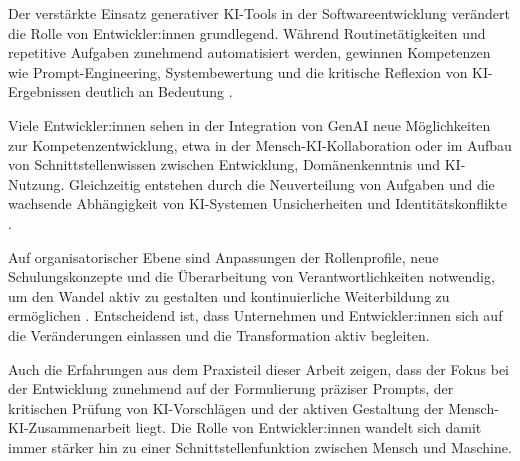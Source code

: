 
Der verstärkte Einsatz generativer KI-Tools in der Softwareentwicklung
verändert die Rolle von Entwickler:innen grundlegend. Während
Routinetätigkeiten und repetitive Aufgaben zunehmend automatisiert werden,
gewinnen Kompetenzen wie Prompt-Engineering, Systembewertung und die kritische
Reflexion von KI-Ergebnissen deutlich an Bedeutung
\cite{schmitt_generative_2024}.

Viele Entwickler:innen sehen in der Integration von GenAI neue Möglichkeiten
zur Kompetenzentwicklung, etwa in der Mensch-KI-Kollaboration oder im Aufbau
von Schnittstellenwissen zwischen Entwicklung, Domänenkenntnis und KI-Nutzung.
Gleichzeitig entstehen durch die Neuverteilung von Aufgaben und die wachsende
Abhängigkeit von KI-Systemen Unsicherheiten und Identitätskonflikte
\cite{schmitt_generative_2024}.

Auf organisatorischer Ebene sind Anpassungen der Rollenprofile, neue
Schulungskonzepte und die Überarbeitung von Verantwortlichkeiten notwendig, um
den Wandel aktiv zu gestalten und kontinuierliche Weiterbildung zu ermöglichen
\cite{nguyen-duc_generative_2023}. Entscheidend ist, dass Unternehmen und
Entwickler:innen sich auf die Veränderungen einlassen und die Transformation
aktiv begleiten.

Auch die Erfahrungen aus dem Praxisteil dieser Arbeit zeigen, dass der Fokus
bei der Entwicklung zunehmend auf der Formulierung präziser Prompts, der
kritischen Prüfung von KI-Vorschlägen und der aktiven Gestaltung der
Mensch-KI-Zusammenarbeit liegt. Die Rolle von Entwickler:innen wandelt sich
damit immer stärker hin zu einer Schnittstellenfunktion zwischen Mensch und
Maschine.
